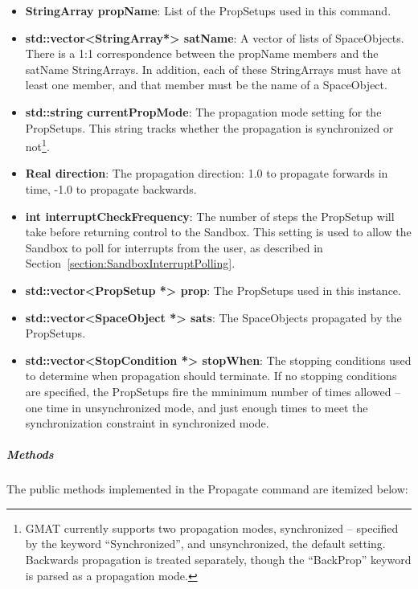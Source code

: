 \begin{itemize}
\item \textbf{StringArray propName}:  List of the PropSetups used in this command.
\item \textbf{std::vector<StringArray*> satName}:  A vector of lists of SpaceObjects.  There is a
1:1 correspondence between the propName members and the satName StringArrays.  In addition, each of
these StringArrays must have at least one member, and that member must be the name of a SpaceObject.
\item \textbf{std::string currentPropMode}:  The propagation mode setting for the PropSetups.  This
string tracks whether the propagation is synchronized or not\footnote{GMAT currently supports two
propagation modes, synchronized -- specified by the keyword ``Synchronized'', and unsynchronized,
the default setting.  Backwards propagation is treated separately, though the ``BackProp'' keyword
is parsed as a propagation mode.}.
\item \textbf{Real direction}: The propagation direction: 1.0 to propagate forwards in time, -1.0
to propagate backwards.
\item \textbf{int interruptCheckFrequency}:  The number of steps the PropSetup will take before
returning control to the Sandbox.  This setting is used to allow the Sandbox to poll for interrupts
from the user, as described in Section~\ref{section:SandboxInterruptPolling}.
\item \textbf{std::vector<PropSetup *> prop}:  The PropSetups used in this instance.
\item \textbf{std::vector<SpaceObject *> sats}:  The SpaceObjects propagated by the PropSetups.
\item \textbf{std::vector<StopCondition *> stopWhen}:  The stopping conditions used to determine
when propagation should terminate.  If no stopping conditions are specified, the PropSetups fire
the mminimum number of times allowed -- one time in unsynchronized mode, and just enough times to
meet the synchronization constraint in synchronized mode.
\end{itemize}

\subparagraph{\textit{Methods}}

The public methods implemented in the Propagate command are itemized below:

